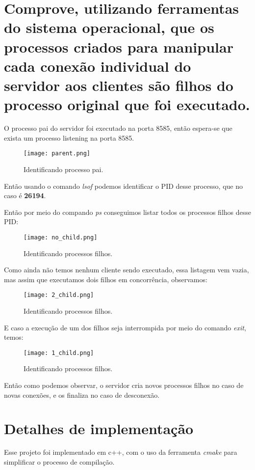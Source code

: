 \documentclass[12pt,a4paper]{report}
\begin{document}
\section{Comprove, utilizando ferramentas do sistema operacional, que os processos criados para
manipular cada conexão individual do servidor aos clientes são filhos do processo original que
foi executado.}

O processo pai do servidor foi executado na porta 8585, então espera-se que exista um processo listening na porta 8585.

\begin{figure}[H]
  \texttt{[image: parent.png]}
  \caption{Identificando processo pai.}
\end{figure}

Então usando o comando \emph{lsof} podemos identificar o PID desse processo, que no caso é \textbf{26194}.

Então por meio do compando \emph{ps} conseguimos listar todos os processos filhos desse PID:

\begin{figure}[H]
  \texttt{[image: no\_child.png]}
  \caption{Identificando processos filhos.}
\end{figure}

Como ainda não temos nenhum cliente sendo executado, essa listagem vem vazia, mas assim que executamos dois filhos em concorrência, observamos:

\begin{figure}[H]
  \texttt{[image: 2\_child.png]}
  \caption{Identificando processos filhos.}
\end{figure}

E caso a execução de um dos filhos seja interrompida por meio do comando \emph{exit}, temos:

\begin{figure}[H]
  \texttt{[image: 1\_child.png]}
  \caption{Identificando processos filhos.}
\end{figure}

Então como podemos observar, o servidor cria novos processos filhos no caso de novas conexões, e os finaliza no caso de desconexão.

\section{Detalhes de implementação}

Esse projeto foi implementado em c++, com o uso da ferramenta \emph{cmake} para simplificar o processo de compilação.
\end{document}
